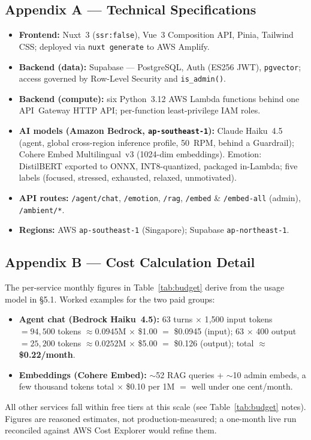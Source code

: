 \documentclass[a4paper,11pt]{article}
\begin{document}
	\subsection{Appendix A --- Technical Specifications}
	\begin{itemize}
		\item \textbf{Frontend:} Nuxt~3 (\texttt{ssr:false}), Vue~3 Composition API, Pinia,
		      Tailwind CSS; deployed via \texttt{nuxt generate} to AWS Amplify.
		\item \textbf{Backend (data):} Supabase --- PostgreSQL, Auth (ES256 JWT),
		      \texttt{pgvector}; access governed by Row-Level Security and \texttt{is\_admin()}.
		\item \textbf{Backend (compute):} six Python~3.12 AWS Lambda functions behind one
		      API~Gateway HTTP API; per-function least-privilege IAM roles.
		\item \textbf{AI models (Amazon Bedrock, \texttt{ap-southeast-1}):} Claude Haiku~4.5
		      (agent, global cross-region inference profile, 50~RPM, behind a Guardrail);
		      Cohere Embed Multilingual~v3 (1024-dim embeddings). Emotion: DistilBERT exported to
		      ONNX, INT8-quantized, packaged in-Lambda; five labels (focused, stressed,
		      exhausted, relaxed, unmotivated).
		\item \textbf{API routes:} \texttt{/agent/chat}, \texttt{/emotion}, \texttt{/rag},
		      \texttt{/embed} \& \texttt{/embed-all} (admin), \texttt{/ambient/*}.
		\item \textbf{Regions:} AWS \texttt{ap-southeast-1} (Singapore); Supabase
		      \texttt{ap-northeast-1}.
	\end{itemize}

	\subsection{Appendix B --- Cost Calculation Detail}
	The per-service monthly figures in Table~\ref{tab:budget} derive from the usage model in
	\S5.1. Worked examples for the two paid groups:
	\begin{itemize}
		\item \textbf{Agent chat (Bedrock Haiku~4.5):} 63 turns $\times$ 1{,}500 input tokens
		      $= 94{,}500$ tokens $\approx 0.0945$M $\times$ \$1.00 $=$ \$0.0945 (input); 63
		      $\times$ 400 output $= 25{,}200$ tokens $\approx 0.0252$M $\times$ \$5.00 $=$
		      \$0.126 (output); total $\approx$ \textbf{\$0.22/month}.
		\item \textbf{Embeddings (Cohere Embed):} $\sim$52 RAG queries + $\sim$10 admin embeds,
		      a few thousand tokens total $\times$ \$0.10 per 1M $=$ well under one cent/month.
	\end{itemize}
	All other services fall within free tiers at this scale (see Table~\ref{tab:budget} notes).
	Figures are reasoned estimates, not production-measured; a one-month live run reconciled
	against AWS Cost Explorer would refine them.
\end{document}
